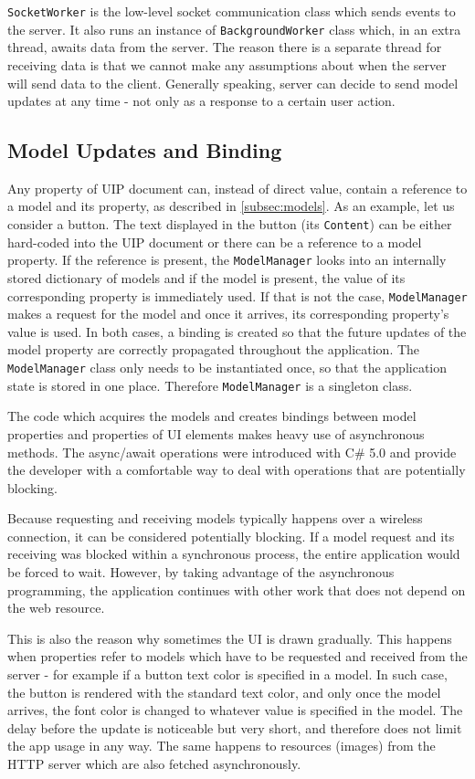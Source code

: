 \texttt{SocketWorker} is the low-level socket communication class which sends events to the server. It also runs an instance of \texttt{BackgroundWorker} class which, in an extra thread, awaits data from the server. The reason there is a separate thread for receiving data is that we cannot make any assumptions about when the server will send data to the client. Generally speaking, server can decide to send model updates at any time - not only as a response to a certain user action.

\subsection{Model Updates and Binding}
Any property of UIP document can, instead of direct value, contain a reference to a model and its property, as described in \ref{subsec:models}. As an example, let us consider a button. The text displayed in the button (its \texttt{Content}) can be either hard-coded into the UIP document or there can be a reference to a model property. If the reference is present, the \texttt{ModelManager} looks into an internally stored dictionary of models and if the model is present, the value of its corresponding property is immediately used. If that is not the case, \texttt{ModelManager} makes a request for the model and once it arrives, its corresponding property's value is used. In both cases, a binding is created so that the future updates of the model property are correctly propagated throughout the application. The \texttt{ModelManager} class only needs to be instantiated once, so that the application state is stored in one place. Therefore \texttt{ModelManager} is a singleton class.

The code which acquires the models and creates bindings between model properties and properties of UI elements makes heavy use of asynchronous methods. The async/await operations were introduced with C\# 5.0  and provide the developer with a comfortable way to deal with operations that are potentially blocking.

Because requesting and receiving models typically happens over a wireless connection, it can be considered potentially blocking. If a model request and its receiving was blocked within a synchronous process, the entire application would be forced to wait. However, by taking advantage of the asynchronous programming, the application continues with other work that does not depend on the web resource.

This is also the reason why sometimes the UI is drawn gradually. This happens when properties refer to models which have to be requested and received from the server - for example if a button text color is specified in a model. In such case, the button is rendered with the standard text color, and only once the model arrives, the font color is changed to whatever value is specified in the model. The delay before the update is noticeable but very short, and therefore does not limit the app usage in any way. The same happens to resources (images) from the HTTP server which are also fetched asynchronously.

